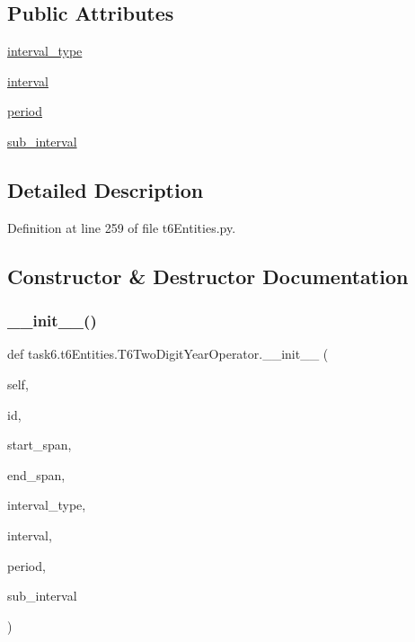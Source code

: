 \subsection*{Public Attributes}
\begin{DoxyCompactItemize}
\item 
\hyperlink{classtask6_1_1t6Entities_1_1T6TwoDigitYearOperator_a4942dc925e5400f3877d10b184f83321}{interval\+\_\+type}
\item 
\hyperlink{classtask6_1_1t6Entities_1_1T6TwoDigitYearOperator_a12bcb3df12dbc55a9798b07d533ff9a2}{interval}
\item 
\hyperlink{classtask6_1_1t6Entities_1_1T6TwoDigitYearOperator_ab90e3c1d93213f9719a59f5806ddf6df}{period}
\item 
\hyperlink{classtask6_1_1t6Entities_1_1T6TwoDigitYearOperator_a324e05be351f629bd65001d558ba168c}{sub\+\_\+interval}
\end{DoxyCompactItemize}


\subsection{Detailed Description}


Definition at line 259 of file t6\+Entities.\+py.



\subsection{Constructor \& Destructor Documentation}
\mbox{\label{classtask6_1_1t6Entities_1_1T6TwoDigitYearOperator_af6730d8b56d1c70a8a65798b6eb10ce0}} 
\subsubsection{\texorpdfstring{\+\_\+\+\_\+init\+\_\+\+\_\+()}{\_\_init\_\_()}}
{\footnotesize\ttfamily def task6.\+t6\+Entities.\+T6\+Two\+Digit\+Year\+Operator.\+\_\+\+\_\+init\+\_\+\+\_\+ (\begin{DoxyParamCaption}\item[{}]{self,  }\item[{}]{id,  }\item[{}]{start\+\_\+span,  }\item[{}]{end\+\_\+span,  }\item[{}]{interval\+\_\+type,  }\item[{}]{interval,  }\item[{}]{period,  }\item[{}]{sub\+\_\+interval }\end{DoxyParamCaption})}



